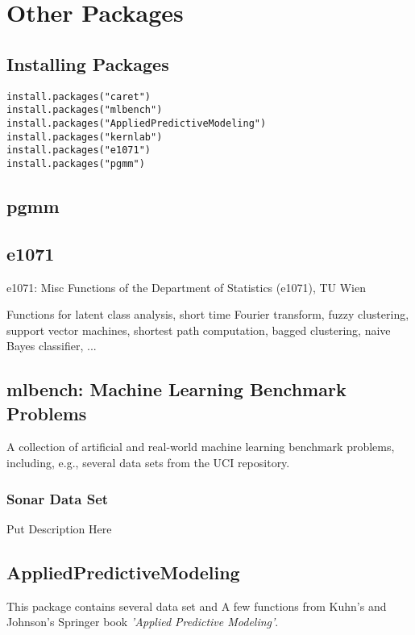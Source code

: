 \documentclass[caret-main.tex]{subfiles}
\begin{document}
\section{Other Packages}

\subsection{Installing Packages}

\begin{framed}
\begin{verbatim}
install.packages("caret")
install.packages("mlbench")
install.packages("AppliedPredictiveModeling")
install.packages("kernlab")
install.packages("e1071")
install.packages("pgmm")
\end{verbatim}
\end{framed}

\subsection{pgmm}

\subsection{e1071}
e1071: Misc Functions of the Department of Statistics (e1071), TU Wien

Functions for latent class analysis, short time Fourier transform, fuzzy clustering, support vector machines, shortest path computation, bagged clustering, naive Bayes classifier, ...

\subsection{mlbench: Machine Learning Benchmark Problems}

A collection of artificial and real-world machine learning benchmark problems, including, e.g., several data sets from the UCI repository.


\subsubsection{Sonar Data Set}

Put Description Here
\newpage
\subsection{AppliedPredictiveModeling}
This package contains several data set and A few functions from Kuhn's and Johnson's Springer book \emph{'Applied Predictive Modeling'}.
\end{document}
